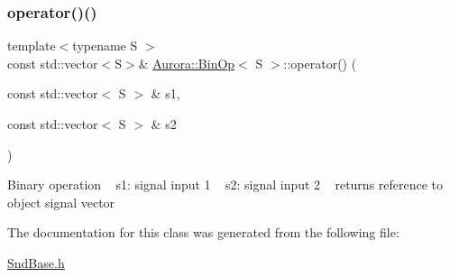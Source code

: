 \subsubsection{\texorpdfstring{operator()()}{operator()()}\hspace{0.1cm}{\footnotesize\ttfamily [3/3]}}
{\footnotesize\ttfamily template$<$typename S $>$ \\
const std\+::vector$<$S$>$\& \hyperlink{class_aurora_1_1_bin_op}{Aurora\+::\+Bin\+Op}$<$ S $>$\+::operator() (\begin{DoxyParamCaption}\item[{const std\+::vector$<$ S $>$ \&}]{s1,  }\item[{const std\+::vector$<$ S $>$ \&}]{s2 }\end{DoxyParamCaption})\hspace{0.3cm}{\ttfamily [inline]}}

Binary operation ~\newline
s1\+: signal input 1 ~\newline
s2\+: signal input 2 ~\newline
returns reference to object signal vector 

The documentation for this class was generated from the following file\+:\begin{DoxyCompactItemize}
\item 
\hyperlink{_snd_base_8h}{Snd\+Base.\+h}\end{DoxyCompactItemize}
